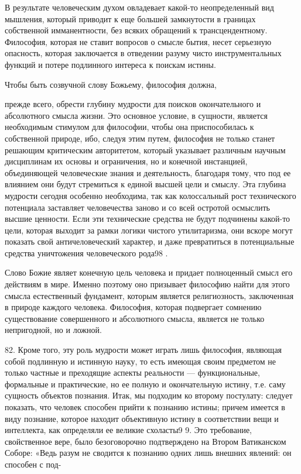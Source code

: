 \documentclass[a5paper,10pt]{article}
\begin{document}
В результате человеческим духом овладевает какой-то неопределенный вид
мышления, который приводит к еще большей замкнутости в границах собственной
имманентности, без всяких обращений к трансцендентному. Философия, которая не
ставит вопросов о смысле бытия, несет серьезную опасность, которая заключается
в отведении разуму чисто инструментальных функций и потере подлинного интереса
к поискам истины.

Чтобы быть созвучной слову Божьему, философия должна,

прежде всего, обрести глубину мудрости для поисков окончательного и абсолютного
смысла жизни. Это основное условие, в сущности, является необходимым стимулом
для философии, чтобы она приспособилась к собственной природе, ибо, следуя этим
путем, философия не только станет решающим критическим авторитетом, который
указывает различным научным дисциплинам их основы и ограничения, но и конечной
инстанцией, объединяющей человеческие знания и деятельность, благодаря тому,
что под ее влиянием они будут стремиться к единой высшей цели и смыслу. Эта
глубина мудрости сегодня особенно необходима, так как колоссальный рост
технического потенциала заставляет человечества заново и со всей остротой
осмыслить высшие ценности. Если эти технические средства не будут подчинены
какой-то цели, которая выходит за рамки логики чистого утилитаризма, они вскоре
могут показать свой античеловеческий характер, и даже превратиться в
потенциальные средства уничтожения человеческого рода98 .

Слово Божие являет конечную цель человека и придает полноценный смысл его
действиям в мире. Именно поэтому оно призывает философию найти для этого смысла
естественный фундамент, которым является религиозность, заключенная в природе
каждого человека. Философия, которая подвергает сомнению существование
совершенного и абсолютного смысла, является не только непригодной, но и ложной.

82. Кроме того, эту роль мудрости может играть лишь философия, являющая собой
подлинную и истинную науку, то есть имеющая своим предметом не только частные и
преходящие аспекты реальности — функциональные, формальные и практические, но
ее полную и окончательную истину, т.е. саму сущность объектов познания. Итак,
мы подходим ко второму постулату: следует показать, что человек способен прийти
к познанию истины; причем имеется в виду познание, которое находит объективную
истину в соответствии вещи и интеллекта, как определяли ее великие схоласты9 9.
Это требование, свойственное вере, было безоговорочно подтверждено на Втором
Ватиканском Соборе: «Ведь разум не сводится к познанию одних лишь внешних
явлений: он способен с под-
\end{document}
